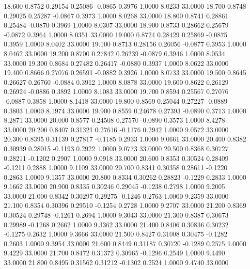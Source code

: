   18.600   0.8752   0.29154   0.25086  -0.0865   0.3976   1.0000   8.0233  33.0000
  18.700   0.8748   0.29025   0.25287  -0.0867   0.3973   1.0000   8.0268  33.0000
  18.800   0.8741   0.28861   0.25484  -0.0870   0.3969   1.0000   8.0307  33.0000
  18.900   0.8733   0.28662   0.25679  -0.0872   0.3964   1.0000   8.0351  33.0000
  19.000   0.8724   0.28429   0.25869  -0.0875   0.3959   1.0000   8.0402  33.0000
  19.100   0.8713   0.28156   0.26056  -0.0877   0.3953   1.0000   8.0462  33.0000
  19.200   0.8700   0.27842   0.26239  -0.0879   0.3946   1.0000   8.0534  33.0000
  19.300   0.8684   0.27482   0.26417  -0.0880   0.3937   1.0000   8.0622  33.0000
  19.400   0.8666   0.27076   0.26591  -0.0882   0.3926   1.0000   8.0733  33.0000
  19.500   0.8645   0.26627   0.26760  -0.0884   0.3912   1.0000   8.0878  33.0000
  19.600   0.8622   0.26129   0.26924  -0.0886   0.3892   1.0000   8.1083  33.0000
  19.700   0.8594   0.25567   0.27076  -0.0887   0.3858   1.0000   8.1418  33.0000
  19.800   0.8569   0.25044   0.27227  -0.0889   0.3803   1.0000   8.1974  33.0000
  19.900   0.8559   0.24678   0.27393  -0.0890   0.3713   1.0000   8.2871  33.0000
  20.000   0.8577   0.24508   0.27570  -0.0890   0.3573   1.0000   8.4278  33.0000
  20.200   0.8407   0.31321   0.27616  -0.1176   0.2942   1.0000   9.0572  33.0000
  20.300   0.8395   0.31139   0.27817  -0.1185   0.2933   1.0000   9.0661  33.0000
  20.400   0.8382   0.30939   0.28015  -0.1193   0.2922   1.0000   9.0773  33.0000
  20.500   0.8368   0.30727   0.28211  -0.1202   0.2907   1.0000   9.0918  33.0000
  20.600   0.8353   0.30524   0.28409  -0.1211   0.2888   1.0000   9.1109  33.0000
  20.700   0.8341   0.30358   0.28611  -0.1220   0.2863   1.0000   9.1357  33.0000
  20.800   0.8334   0.30262   0.28823  -0.1229   0.2833   1.0000   9.1662  33.0000
  20.900   0.8335   0.30246   0.29045  -0.1238   0.2798   1.0000   9.2005  33.0000
  21.000   0.8342   0.30297   0.29275  -0.1246   0.2763   1.0000   9.2359  33.0000
  21.100   0.8354   0.30396   0.29510  -0.1254   0.2728   1.0000   9.2707  33.0000
  21.200   0.8369   0.30524   0.29748  -0.1261   0.2694   1.0000   9.3043  33.0000
  21.300   0.8387   0.30673   0.29989  -0.1268   0.2662   1.0000   9.3362  33.0000
  21.400   0.8406   0.30836   0.30232  -0.1275   0.2632   1.0000   9.3666  33.0000
  21.500   0.8427   0.31008   0.30475  -0.1282   0.2603   1.0000   9.3954  33.0000
  21.600   0.8449   0.31187   0.30720  -0.1289   0.2575   1.0000   9.4229  33.0000
  21.700   0.8472   0.31372   0.30965  -0.1296   0.2549   1.0000   9.4490  33.0000
  21.800   0.8495   0.31562   0.31212  -0.1302   0.2524   1.0000   9.4740  33.0000
